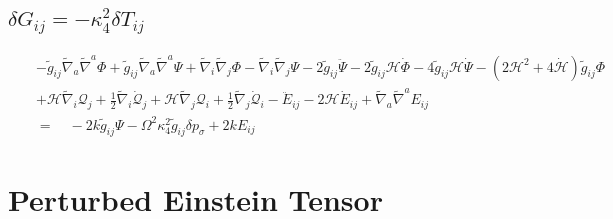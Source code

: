 \documentclass[10pt,letterpaper]{article}
\numberwithin{equation}{section}
\begin{document}
\subsection*{$\delta G_{ij} = -\kappa^2_4 \delta T_{ij}$}
\begin{eqnarray}
 &&-\tilde g_{ij}\tilde\nabla_a\tilde\nabla^a \Phi + \tilde g_{ij} \tilde\nabla_a\tilde\nabla^a \Psi + \tilde\nabla_i\tilde\nabla_j \Phi - \tilde\nabla_i\tilde\nabla_j \Psi
-2 \tilde g_{ij}\ddot \Psi -2\tilde g_{ij}\mathcal H \dot\Phi 
- 4\tilde g_{ij}\mathcal H \dot\Psi
-(2\mathcal H^2+4\dot{\mathcal H})\tilde g_{ij}\Phi
\nonumber\\
&&
+\mathcal H\tilde\nabla_{i}\mathcal Q_{j}+\tfrac{1}{2} \tilde\nabla_{i}\dot{\mathcal Q}_{j}
+ \mathcal H \tilde\nabla_{j}\mathcal Q_{i}+\tfrac{1}{2} \tilde\nabla_{j}\dot{\mathcal Q}_{i}
- \ddot{E}_{ij}- 2 \mathcal H \dot{E}_{ij} + \tilde\nabla_{a}\tilde\nabla^{a}E_{ij}
\nonumber\\
&&=\quad -2k \tilde g_{ij} \Psi-\Omega^2 \kappa^2_4 \tilde g_{ij} \delta p_\sigma +2k E_{ij}
\end{eqnarray}

\section{Perturbed Einstein Tensor}
\end{document}
